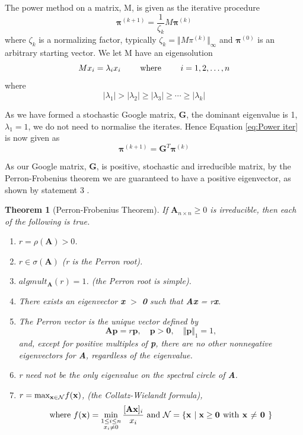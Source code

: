 \documentclass[11pt]{report}
\newtheorem*{theorem*}{Theorem}
\begin{document}
The power method on a matrix, M, is given as the iterative procedure 
\begin{equation} \label{eq:Power iter}
\boldsymbol\pi^{(k+1)} = \frac{1}{\zeta_k}M\boldsymbol\pi^{(k)}
\end{equation} where $\zeta_k$ is a normalizing factor, typically $\zeta_k = \Vert M\pi^{(k)}\Vert_{\infty}$ and $\boldsymbol\pi^{(0)}$ is an arbitrary starting vector. We let M have an eigensolution 
\begin{equation*}
Mx_i = \lambda_ix_i \qquad \textnormal{ where }\qquad  i = 1,2,\ldots,n
\end{equation*} 
where 
\begin{equation*}
\vert\lambda_1\vert>\vert\lambda_2\vert\geq\vert\lambda_3\vert\geq\cdots\geq\vert\lambda_k\vert
\end{equation*}

As we have formed a stochastic Google matrix, \textbf{G}, the dominant eigenvalue is 1, $\lambda_1=1$, we do not need to normalise the iterates. Hence Equation \eqref{eq:Power iter} is now given as
\begin{equation*}
\boldsymbol\pi^{(k+1)} = \textbf{G}^T\boldsymbol\pi^{(k)}
\end{equation*}

As our Google matrix, \textbf{G}, is positive, stochastic and irreducible matrix, by the Perron-Frobenius theorem we are guaranteed to have a positive eigenvector, as shown by statement 3 \cite{thorson2004modeling}.
\begin{theorem*}[Perron-Frobenius Theorem] If \(\textbf{A}_{n \times n} \geq 0\) is irreducible, then each of the following is true.
\begin{enumerate}
\item $r = \rho(\textbf{A}) > 0$.
\item $r \in \sigma (\textbf{A}) $ (\textit{r} is the \textit{Perron root}).
\item $alg mult_\textbf{A}(r) = 1$. (the Perron root is simple).
\item There exists an eigenvector \textbf{x} $>$ \textbf{0} such that \textbf{Ax} = \textit{r}\textbf{x}.
\item The \textit{Perron vector} is the unique vector defined by 
\[\textbf{Ap}=r\textbf{p}, \quad \textbf{p}>\textbf{0}, \quad \Vert \textbf{p} \Vert _1 = 1, \] and, except for positive multiples of \textbf{p}, there are no other nonnegative eigenvectors for \textbf{A}, regardless of the eigenvalue.
\item \textit{r} need not be the only eigenvalue on the spectral circle of \textbf{A}.
\item \(r=\textnormal{max}_{\textbf{x}\in \mathcal{N}} f(\textbf{x})\), (the Collatz-Wielandt formula), 
\begin{equation*}
\textnormal{where } f(\textbf{x}) = \min_{\substack{1\leq i \leq n \\ x_i \neq 0}} \frac{[\textbf{Ax}]_i}{x_i} \textnormal{ and } \mathcal{N} = \{ \textbf{x $\mid \textbf{x} \geq \textbf{0} $ \textnormal{with} \textbf{x} $\neq$ \textbf{0} } \}
\end{equation*}
\end{enumerate}
\end{theorem*} \label{thm:P-F} 
\end{document}
